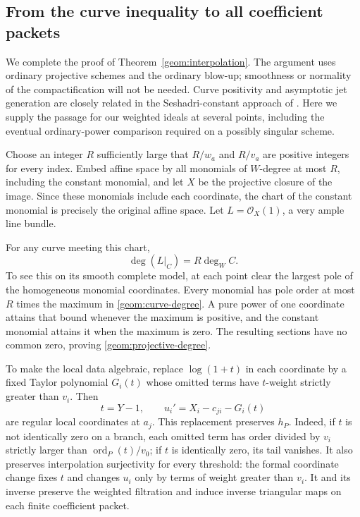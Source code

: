 \subsection{From the curve inequality to all coefficient packets}

We complete the proof of Theorem~\ref{geom:interpolation}. The argument uses
ordinary projective schemes and the ordinary blow-up; smoothness or
normality of the compactification will not be needed. Curve positivity
and asymptotic jet generation are closely related in the Seshadri-constant
approach of \cite[Section~6]{demailly1992}. Here we supply the passage
for our weighted ideals at several points, including the eventual
ordinary-power comparison required on a possibly singular scheme.

Choose an integer $R$ sufficiently large that $R/w_a$ and $R/v_a$ are
positive integers for every index. Embed affine space by all monomials
of $W$-degree at most $R$, including the constant monomial, and let
$X$ be the projective closure of the image. Since these monomials
include each coordinate, the chart of the constant monomial is
precisely the original affine space. Let $L=\mathcal O_X(1)$, a very
ample line bundle.

For any curve meeting this chart,
\begin{equation}
\label{geom:projective-degree}
 \deg(L|_C)=R\deg_W C.
\end{equation}
To see this on its smooth complete model, at each point clear the
largest pole of the homogeneous monomial coordinates. Every monomial
has pole order at most $R$ times the maximum in
\eqref{geom:curve-degree}. A pure power of one coordinate attains
that bound whenever the maximum is positive, and the constant
monomial attains it when the maximum is zero. The resulting sections
have no common zero, proving \eqref{geom:projective-degree}.

To make the local data algebraic, replace $\log(1+t)$ in each
coordinate by a fixed Taylor polynomial $G_i(t)$ whose omitted
terms have $t$-weight strictly greater than $v_i$. Then
\[
 t=Y-1,\qquad u_i'=X_i-c_{ji}-G_i(t)
\]
are regular local coordinates at $a_j$. This replacement preserves
$h_P$. Indeed, if $t$ is not identically zero on a branch, each
omitted term has order divided by $v_i$ strictly larger than
$\operatorname{ord}_P(t)/v_0$; if $t$ is identically zero, its tail
vanishes. It also preserves interpolation surjectivity for every
threshold: the formal coordinate change fixes $t$ and changes
$u_i$ only by terms of weight greater than $v_i$. It and its inverse
preserve the weighted filtration and induce inverse triangular maps
on each finite coefficient packet.

